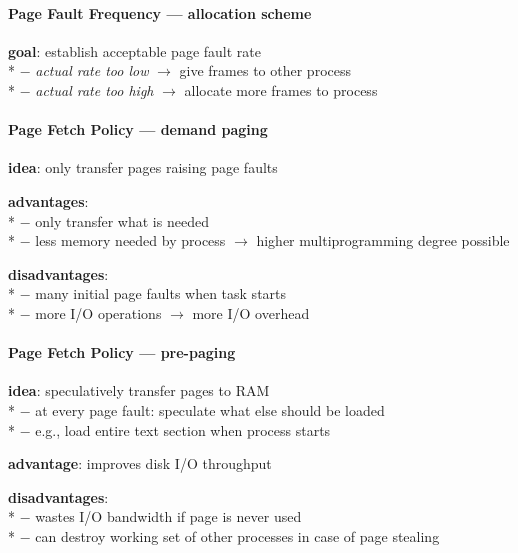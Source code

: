 \paragraph{Page Fault Frequency --- allocation scheme}
\begin{items}
  \item \textbf{goal}: establish acceptable page fault rate \\*
    $ - $ \emph{actual rate too low} $ \to $ give frames to other process \\*
    $ - $ \emph{actual rate too high} $ \to $ allocate more frames to process
\end{items}

\paragraph{Page Fetch Policy --- demand paging}
\begin{items}
  \item \textbf{idea}: only transfer pages raising page faults
  \item \textbf{advantages}: \\*
    $ - $ only transfer what is needed \\*
    $ - $ less memory needed by process $ \to $ higher multiprogramming degree possible
  \item \textbf{disadvantages}: \\*
    $ - $ many initial page faults when task starts \\*
    $ - $ more I/O operations $ \to $ more I/O overhead
\end{items}

\paragraph{Page Fetch Policy --- pre-paging}
\begin{items}
  \item \textbf{idea}: speculatively transfer pages to RAM \\*
    $ - $ at every page fault: speculate what else should be loaded \\*
    $ - $ e.g., load entire text section when process starts
  \item \textbf{advantage}: improves disk I/O throughput
  \item \textbf{disadvantages}: \\*
    $ - $ wastes I/O bandwidth if page is never used \\*
    $ - $ can destroy working set of other processes in case of page stealing
\end{items}


